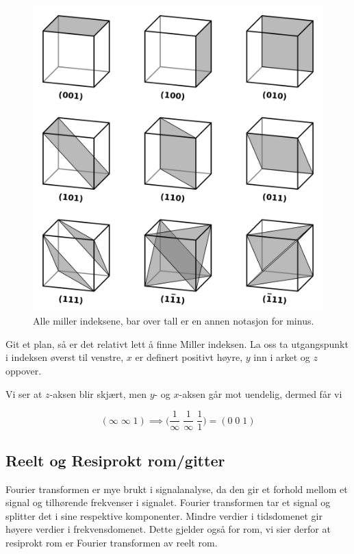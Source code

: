 \begin{figure}[!htb]
    \centering
    \includegraphics[scale=0.3]{Bilder/SamtaleTema4/miller.png}
    \caption{Alle miller indeksene, bar over tall er en annen notasjon for minus.}
    \label{fig:miller}
\end{figure}

Git et plan, så er det relativt lett å finne Miller indeksen. La oss ta utgangspunkt i indeksen øverst til venstre, $x$ er definert positivt høyre, $y$ inn i arket og $z$ oppover. 

Vi ser at $z$-aksen blir skjært, men $y$- og $x$-aksen går mot uendelig, dermed får vi 

\begin{equation*}
    (\infty \; \infty \; 1) \implies \bigg(\frac{1}{\infty}\;
    \frac{1}{\infty}\; \frac{1}{1}\bigg) = (0\;0\;1)
\end{equation*}
 \newpage
 
\subsection{Reelt og Resiprokt rom/gitter}
\label{sec:tema4_8}
Fourier transformen er mye brukt i signalanalyse, da den gir et forhold mellom et signal og tilhørende frekvenser i signalet. Fourier transformen tar et signal og splitter det i sine respektive komponenter. Mindre verdier i tidsdomenet gir høyere verdier i frekvensdomenet. Dette gjelder også for rom, vi sier derfor at resiprokt rom er Fourier transformen av reelt rom.

